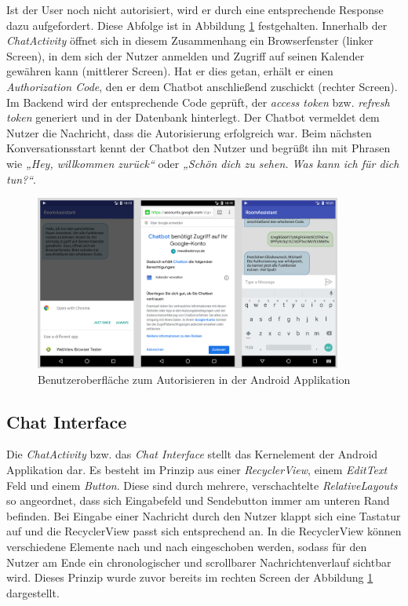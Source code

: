 Ist der User noch nicht autorisiert, wird er durch eine entsprechende Response dazu aufgefordert. Diese Abfolge ist in Abbildung \ref{fig:android-authorization-screen} festgehalten. Innerhalb der \textit{ChatActivity} öffnet sich in diesem Zusammenhang ein Browserfenster (linker Screen), in dem sich der Nutzer anmelden und Zugriff auf seinen Kalender gewähren kann (mittlerer Screen). Hat er dies getan, erhält er einen \textit{Authorization Code}, den er dem Chatbot anschließend zuschickt (rechter Screen). Im Backend wird der entsprechende Code geprüft, der \textit{access token} bzw. \textit{refresh token} generiert und in der Datenbank hinterlegt. Der Chatbot vermeldet dem Nutzer die Nachricht, dass die Autorisierung erfolgreich war. Beim nächsten Konversationsstart kennt der Chatbot den Nutzer und begrüßt ihn mit Phrasen wie \textit{„Hey, willkommen zurück“} oder \textit{„Schön dich zu sehen. Was kann ich für dich tun?“}.
\newline

\begin{figure}[H]
    \centering
    \includegraphics[width=0.9\textwidth]{bilder/AuthorizationScreenCombined.PNG}
    \caption{Benutzeroberfläche zum Autorisieren in der Android Applikation}
    \label{fig:android-authorization-screen}
\end{figure}

\FloatBarrier
\subsection{Chat Interface}
\label{subsec:Chat Interface}

Die \textit{ChatActivity} bzw. das \textit{Chat Interface} stellt das Kernelement der Android Applikation dar. Es besteht im Prinzip aus einer \textit{RecyclerView}, einem \textit{EditText} Feld und einem  \textit{Button}. Diese sind durch mehrere, verschachtelte \textit{RelativeLayouts} so angeordnet, dass sich Eingabefeld und Sendebutton immer am unteren Rand befinden. Bei Eingabe einer Nachricht durch den Nutzer klappt sich eine Tastatur auf und die RecyclerView passt sich entsprechend an. In die RecyclerView können verschiedene Elemente nach und nach eingeschoben werden, sodass für den Nutzer am Ende ein chronologischer und scrollbarer Nachrichtenverlauf sichtbar wird. Dieses Prinzip wurde zuvor bereits im rechten Screen der Abbildung \ref{fig:android-authorization-screen} dargestellt. 

